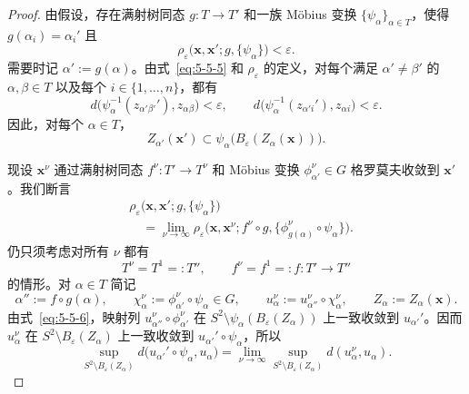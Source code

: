 \begin{proof}
由假设，存在满射树同态 $g:T\to T'$ 和一族 Möbius 变换
$\{\psi_\alpha\}_{\alpha\in T}$，使得 $g(\alpha_i)=\alpha_i'$ 且
\begin{equation}\label{eq:5-5-5}
  \rho_\varepsilon
  \bigl(\mathbf x,\mathbf x';g,\{\psi_\alpha\}\bigr)<\varepsilon.
\end{equation}
需要时记 $\alpha':=g(\alpha)$。由式~\eqref{eq:5-5-5} 和
$\rho_\varepsilon$ 的定义，对每个满足 $\alpha'\ne\beta'$ 的
$\alpha,\beta\in T$ 以及每个 $i\in\{1,\ldots,n\}$，都有
\[
  d\bigl(\psi_\alpha^{-1}(z_{\alpha'\beta'}'),z_{\alpha\beta}\bigr)
  <\varepsilon,
  \qquad
  d\bigl(\psi_\alpha^{-1}(z_{\alpha'i}'),z_{\alpha i}\bigr)
  <\varepsilon.
\]
因此，对每个 $\alpha\in T$，
\begin{equation}\label{eq:5-5-6}
  Z_{\alpha'}(\mathbf x')
  \subset\psi_\alpha\bigl(B_\varepsilon(Z_\alpha(\mathbf x))\bigr).
\end{equation}

现设 $\mathbf x^\nu$ 通过满射树同态 $f^\nu:T'\to T^\nu$ 和 Möbius 变换
$\phi_{\alpha'}^\nu\in G$ 格罗莫夫收敛到 $\mathbf x'$。我们断言
\begin{equation}\label{eq:5-5-7}
  \begin{aligned}
  &\rho_\varepsilon
  \bigl(\mathbf x,\mathbf x';g,\{\psi_\alpha\}\bigr)\\
  &\quad=\lim_{\nu\to\infty}
  \rho_\varepsilon\bigl(
    \mathbf x,\mathbf x^\nu;
    f^\nu\circ g,
    \{\phi_{g(\alpha)}^\nu\circ\psi_\alpha\}\bigr).
  \end{aligned}
\end{equation}
仍只须考虑对所有 $\nu$ 都有
\[
  T^\nu=T^1=:T'',
  \qquad
  f^\nu=f^1=:f:T'\to T''
\]
的情形。对 $\alpha\in T$ 简记
\[
  \alpha'':=f\circ g(\alpha),
  \qquad
  \chi_\alpha^\nu:=\phi_{\alpha'}^\nu\circ\psi_\alpha\in G,
  \qquad
  u_\alpha^\nu:=u_{\alpha''}^\nu\circ\chi_\alpha^\nu,
  \qquad
  Z_\alpha:=Z_\alpha(\mathbf x).
\]
由式~\eqref{eq:5-5-6}，映射列
$u_{\alpha''}^\nu\circ\phi_{\alpha'}^\nu$ 在
$S^2\setminus\psi_\alpha(B_\varepsilon(Z_\alpha))$ 上一致收敛到
$u_{\alpha'}'$。因而 $u_\alpha^\nu$ 在
$S^2\setminus B_\varepsilon(Z_\alpha)$ 上一致收敛到
$u_{\alpha'}'\circ\psi_\alpha$，所以
\[
  \sup_{S^2\setminus B_\varepsilon(Z_\alpha)}
  d\bigl(u_{\alpha'}'\circ\psi_\alpha,u_\alpha\bigr)
  =\lim_{\nu\to\infty}
  \sup_{S^2\setminus B_\varepsilon(Z_\alpha)}
  d(u_\alpha^\nu,u_\alpha).
\]


\end{proof}
